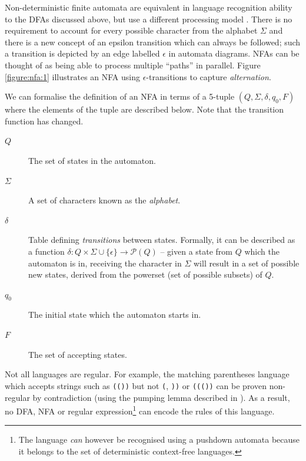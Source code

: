 \documentclass[a4paper,openany]{book}
\begin{document}
Non-deterministic finite automata are equivalent in language recognition ability to the DFAs discussed above, but use a different processing model \citep[p.~46]{sipser2012introduction}. There is no requirement to account for every possible character from the alphabet $\Sigma$ and there is a new concept of an epsilon transition which can always be followed; such a transition is depicted by an edge labelled $\epsilon$ in automata diagrams. NFAs can be thought of as being able to process multiple ``paths'' in parallel. Figure \ref{figure:nfa:1} illustrates an NFA using $\epsilon$-transitions to capture \emph{alternation}.

We can formalise the definition of an NFA in terms of a 5-tuple $(Q, \Sigma, \delta, q_0, F)$ where the elements of the tuple are described below. Note that the transition function has changed.

\begin{description}
\item[$Q$] The set of states in the automaton.
\item[$\Sigma$] A set of characters known as the \emph{alphabet}.
\item[$\delta$] Table defining \emph{transitions} between states. Formally, it can be described as a function $\delta : Q \times \Sigma \cup \{\epsilon\} \rightarrow \mathcal{P}(Q)$ -- given a state from $Q$ which the automaton is in, receiving the character in $\Sigma$ will result in a set of possible new states, derived from the powerset (set of possible subsets) of $Q$.
\item[$q_0$] The initial state which the automaton starts in.
\item[$F$] The set of accepting states.
\end{description}

Not all languages are regular. For example, the matching parentheses language which accepts strings such as \texttt{(())} but not \texttt{(}, \texttt{))} or \texttt{((())} can be proven non-regular by contradiction (using the pumping lemma described in \citet{rabin1959finite}). As a result, no DFA, NFA or regular expression\footnote{The language \emph{can} however be recognised using a pushdown automata because it belongs to the set of deterministic context-free languages.} can encode the rules of this language.
\end{document}

